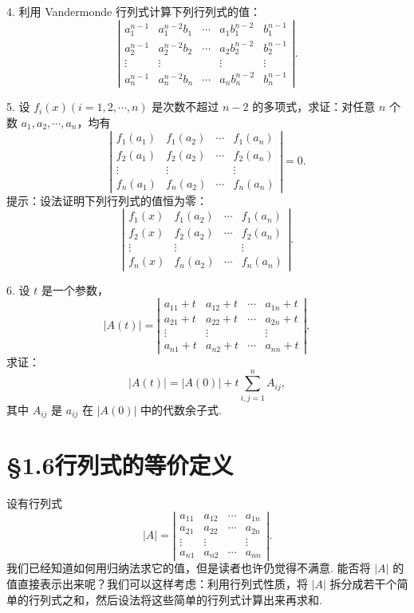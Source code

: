\documentclass[UTF8,12pt,a4paper,fontset=fandol]{ctexart}
\begin{document}
4. 利用 Vandermonde 行列式计算下列行列式的值：
\[
\left|\begin{array}{ccccc}
a_1^{n-1} & a_1^{n-2}b_1 & \cdots & a_1b_1^{n-2} & b_1^{n-1}\\
a_2^{n-1} & a_2^{n-2}b_2 & \cdots & a_2b_2^{n-2} & b_2^{n-1}\\
\vdots & \vdots & & \vdots & \vdots\\
a_n^{n-1} & a_n^{n-2}b_n & \cdots & a_nb_n^{n-2} & b_n^{n-1}
\end{array}\right|.
\]

5. 设 $f_i(x)(i=1,2,\cdots,n)$ 是次数不超过 $n-2$ 的多项式，求证：对任意 $n$ 个数 $a_1,a_2,\cdots,a_n$，均有
\[
\left|\begin{array}{cccc}
f_1(a_1) & f_1(a_2) & \cdots & f_1(a_n)\\
f_2(a_1) & f_2(a_2) & \cdots & f_2(a_n)\\
\vdots & \vdots & & \vdots\\
f_n(a_1) & f_n(a_2) & \cdots & f_n(a_n)
\end{array}\right|=0.
\]
提示：设法证明下列行列式的值恒为零：
\[
\left|\begin{array}{cccc}
f_1(x) & f_1(a_2) & \cdots & f_1(a_n)\\
f_2(x) & f_2(a_2) & \cdots & f_2(a_n)\\
\vdots & \vdots & & \vdots\\
f_n(x) & f_n(a_2) & \cdots & f_n(a_n)
\end{array}\right|.
\]

6. 设 $t$ 是一个参数，
\[
|A(t)|=
\left|\begin{array}{cccc}
a_{11}+t & a_{12}+t & \cdots & a_{1n}+t\\
a_{21}+t & a_{22}+t & \cdots & a_{2n}+t\\
\vdots & \vdots & & \vdots\\
a_{n1}+t & a_{n2}+t & \cdots & a_{nn}+t
\end{array}\right|,
\]
求证：
\[
|A(t)|=|A(0)|+t\sum_{i,j=1}^n A_{ij},
\]
其中 $A_{ij}$ 是 $a_{ij}$ 在 $|A(0)|$ 中的代数余子式.

\section*{§1.6\quad 行列式的等价定义}

设有行列式
\begin{equation}
|A|=
\left|\begin{array}{cccc}
a_{11} & a_{12} & \cdots & a_{1n}\\
a_{21} & a_{22} & \cdots & a_{2n}\\
\vdots & \vdots & & \vdots\\
a_{n1} & a_{n2} & \cdots & a_{nn}
\end{array}\right|.
\tag{1.6.1}
\end{equation}
我们已经知道如何用归纳法求它的值，但是读者也许仍觉得不满意. 能否将 $|A|$ 的值直接表示出来呢？我们可以这样考虑：利用行列式性质，将 $|A|$ 拆分成若干个简单的行列式之和，然后设法将这些简单的行列式计算出来再求和.
\end{document}
